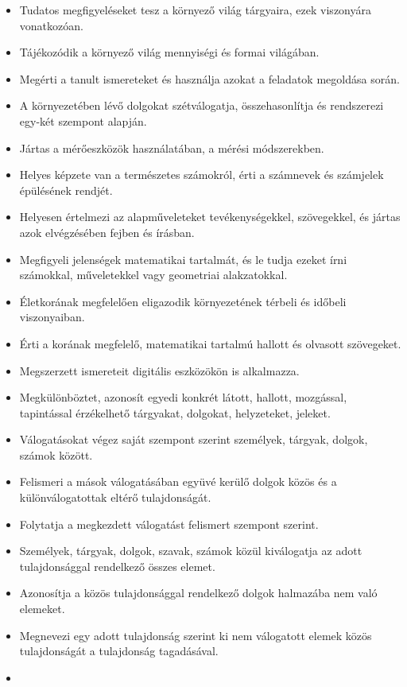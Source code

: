 \begin{itemize}
\item
  Tudatos megfigyeléseket tesz a környező világ tárgyaira, ezek
  viszonyára vonatkozóan.
\item
  Tájékozódik a környező világ mennyiségi és formai világában.
\item
  Megérti a tanult ismereteket és használja azokat a feladatok megoldása
  során.
\item
  A környezetében lévő dolgokat szétválogatja, összehasonlítja és
  rendszerezi egy-két szempont alapján.
\item
  Jártas a mérőeszközök használatában, a mérési módszerekben.
\item
  Helyes képzete van a természetes számokról, érti a számnevek és
  számjelek épülésének rendjét.
\item
  Helyesen értelmezi az alapműveleteket tevékenységekkel, szövegekkel,
  és jártas azok elvégzésében fejben és írásban.
\item
  Megfigyeli jelenségek matematikai tartalmát, és le tudja ezeket írni
  számokkal, műveletekkel vagy geometriai alakzatokkal.
\item
  Életkorának megfelelően eligazodik környezetének térbeli és időbeli
  viszonyaiban.
\item
  Érti a korának megfelelő, matematikai tartalmú hallott és olvasott
  szövegeket.
\item
  Megszerzett ismereteit digitális eszközökön is alkalmazza.
\item
  Megkülönböztet, azonosít egyedi konkrét látott, hallott, mozgással,
  tapintással érzékelhető tárgyakat, dolgokat, helyzeteket, jeleket.
\item
  Válogatásokat végez saját szempont szerint személyek, tárgyak, dolgok,
  számok között.
\item
  Felismeri a mások válogatásában együvé kerülő dolgok közös és a
  különválogatottak eltérő tulajdonságát.
\item
  Folytatja a megkezdett válogatást felismert szempont szerint.
\item
  Személyek, tárgyak, dolgok, szavak, számok közül kiválogatja az adott
  tulajdonsággal rendelkező összes elemet.
\item
  Azonosítja a közös tulajdonsággal rendelkező dolgok halmazába nem való
  elemeket.
\item
  Megnevezi egy adott tulajdonság szerint ki nem válogatott elemek közös
  tulajdonságát a tulajdonság tagadásával.
\item

\end{itemize}
